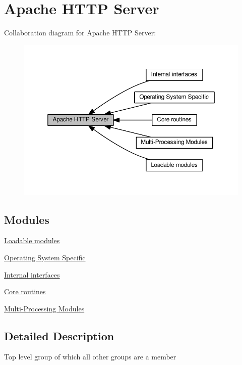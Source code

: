 \hypertarget{group__APACHE}{}\section{Apache H\+T\+TP Server}
\label{group__APACHE}
Collaboration diagram for Apache H\+T\+TP Server\+:
\nopagebreak
\begin{figure}[H]
\begin{center}
\leavevmode
\includegraphics[width=350pt]{group__APACHE}
\end{center}
\end{figure}
\subsection*{Modules}
\begin{DoxyCompactItemize}
\item 
\hyperlink{group__APACHE__MODS}{Loadable modules}
\item 
\hyperlink{group__APACHE__OS}{Operating System Specific}
\item 
\hyperlink{group__APACHE__INTERNAL}{Internal interfaces}
\item 
\hyperlink{group__APACHE__CORE}{Core routines}
\item 
\hyperlink{group__APACHE__MPM}{Multi-\/\+Processing Modules}
\end{DoxyCompactItemize}


\subsection{Detailed Description}
Top level group of which all other groups are a member 